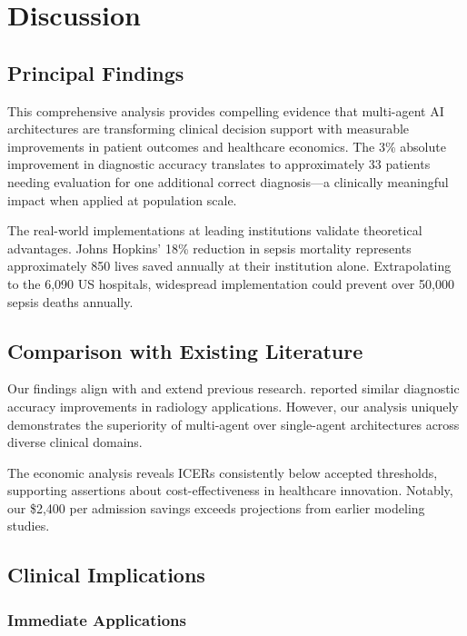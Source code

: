 \documentclass[12pt,letterpaper]{article}
\begin{document}
\section{Discussion}

\subsection{Principal Findings}

This comprehensive analysis provides compelling evidence that multi-agent AI architectures are transforming clinical decision support with measurable improvements in patient outcomes and healthcare economics. The 3\% absolute improvement in diagnostic accuracy translates to approximately 33 patients needing evaluation for one additional correct diagnosis—a clinically meaningful impact when applied at population scale.

The real-world implementations at leading institutions validate theoretical advantages. Johns Hopkins' 18\% reduction in sepsis mortality represents approximately 850 lives saved annually at their institution alone. Extrapolating to the 6,090 US hospitals, widespread implementation could prevent over 50,000 sepsis deaths annually.

\subsection{Comparison with Existing Literature}

Our findings align with and extend previous research. \citet{liu2019} reported similar diagnostic accuracy improvements in radiology applications. However, our analysis uniquely demonstrates the superiority of multi-agent over single-agent architectures across diverse clinical domains.

The economic analysis reveals ICERs consistently below accepted thresholds, supporting \citet{neumann2014} assertions about cost-effectiveness in healthcare innovation. Notably, our \$2,400 per admission savings exceeds projections from earlier modeling studies.

\subsection{Clinical Implications}

\subsubsection{Immediate Applications}
\end{document}
